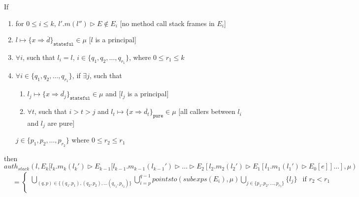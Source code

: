 \documentclass{llncs}
\newcommand{\keywadj}[1]{\mathtt{#1}}
\newcommand{\intuition}[1]{#1}
\begin{document}
\begin{mdframed}
\begin{lemma}
\label{l:main-a-stack}
If
\begin{enumerate}
\item for $0 \leq i \leq k$, $l'.m(l'') \rhd E \not\in E_i$ \intuition{\hspace{150pt} [no method call stack frames in $E_i$]}
\item $l \mapsto \{ x \Rightarrow \overline{d} \}_{\keywadj{stateful}} \in \mu$ \intuition{\hspace{270pt} [$l$ is a principal]}
\item $\forall i$, such that $l_i = l$, $i \in \{ q_1, q_2, \dots, q_{r_1} \}$, where $0 \leq r_1 \leq k$ \intuition{}
\item $\forall i \in \{ q_1, q_2, \dots, q_{r_1} \}$, if $\exists j$, such that
\begin{enumerate}
\item $l_j \mapsto \{ x \Rightarrow \overline{d_j} \}_{\keywadj{stateful}} \in \mu$ and \intuition{\hspace{220pt} [$l_j$ is a principal]}
\item $\forall t$, such that $i > t > j$ and $l_t \mapsto \{ x \Rightarrow \overline{d_t} \}_{\keywadj{pure}} \in \mu$ \intuition{\hspace{40pt} [all callers between $l_i$ and $l_j$ are pure]}
\end{enumerate}
$j \in \{ p_1, p_2, \dots, p_{r_2}\}$ where $0 \leq r_2 \leq r_1$
\intuition{}
\end{enumerate}
then
\noindent$auth_{stack}(l, E_k[l_k.m_k(l_k') \rhd E_{k-1}[l_{k-1}.m_{k-1}(l_{k-1}') \rhd \dots \rhd E_2[l_2.m_2(l_2') \rhd E_1[l_1.m_1(l_1') \rhd E_0[e]] \dots ], \mu)$
\vspace{-7pt}
\begin{align*}
&=
\begin{cases}
    \bigcup_{(q, p) \in \{ (q_1, p_1), (q_2, p_2), \dots (q_{r_2}, p_{r_2}) \}} \bigcup^{q-1}_{i = p} pointsto(subexps(E_i), \mu) \bigcup_{j \in \{ p_1, p_2, \dots, p_{r_2} \}} \{ l_j \} & \text{if } r_2 < r_1\\

\end{cases}
\end{align*}
\end{lemma}
\end{mdframed}
\end{document}
